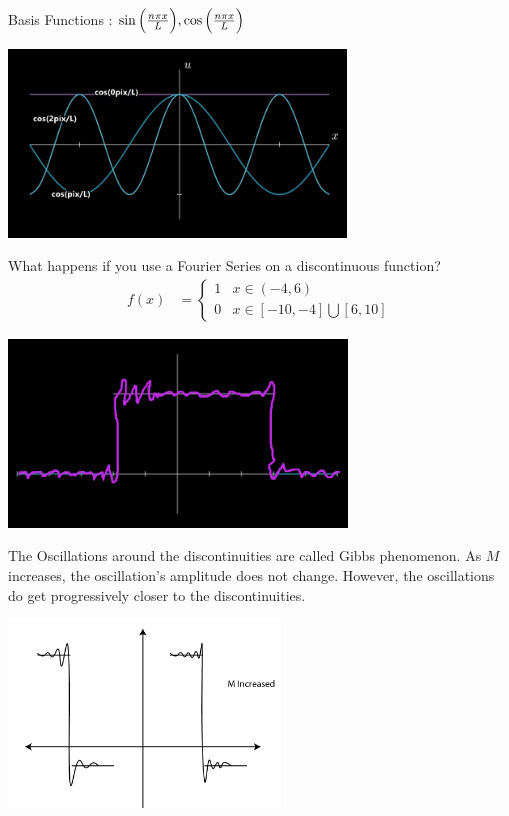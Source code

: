 \documentclass{article}
\begin{document}
  Basis Functions : $\sin \Big( \frac{n \pi x}{L} \Big), \cos \Big( \frac{n \pi x}{L} \Big)$
  \begin{center}
    \includegraphics[height=5cm]{Fourier Basis Functions}
  \end{center}

  What happens if you use a Fourier Series on a discontinuous function?
  \begin{align}
    f(x) & =
    \begin{cases}
      1 & x \in (-4, 6)\\
      0 & x \in [-10, -4] \bigcup [6, 10]
    \end{cases}
  \end{align}

  \begin{center}
    \includegraphics[height=5cm]{Fourier Finite Fourier Series}
  \end{center}

  The Oscillations around the discontinuities are called Gibbs phenomenon. As $M$ increases, the oscillation's amplitude does not change. However, the oscillations do get progressively closer to the discontinuities.

  \begin{center}
    \includegraphics[height=5cm]{Fourier M}
  \end{center}
\end{document}
